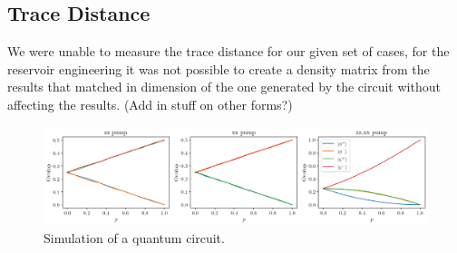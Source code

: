 \documentclass[12pt]{article}
\begin{document}
  \subsection{Trace Distance}
        We were unable to measure the trace distance for our given set of cases, for the reservoir engineering it was not possible to create a density matrix from the results that matched in dimension of the one generated by the circuit without affecting the results. (Add in stuff on other forms?)

  \begin{figure}
    \centering
    \includegraphics[width=\textwidth]{images/reservoir-engineering-simulation}
    \caption{Simulation of a quantum circuit.%
      \label{fig:reservoir-engineering-simulation}}
  \end{figure}

  \printbibliography
\end{document}
